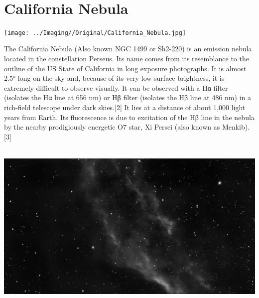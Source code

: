 \ \\\section{California Nebula}
\texttt{[image: ../Imaging//Original/California\_Nebula.jpg]}
{\footnotesize\color{white}
The California Nebula (Also known NGC 1499 or Sh2-220) is an emission nebula located in the constellation Perseus. Its name comes from its resemblance to the outline of the US State of California in long exposure photographs. It is almost 2.5° long on the sky and, because of its very low surface brightness, it is extremely difficult to observe visually. It can be observed with a Hα filter (isolates the Hα line at 656 nm) or Hβ filter (isolates the Hβ line at 486 nm) in a rich-field telescope under dark skies.[2] It lies at a distance of about 1,000 light years from Earth. Its fluorescence is due to excitation of the Hβ line in the nebula by the nearby prodigiously energetic O7 star, Xi Persei (also known as Menkib).[3]


}\ \\
\includegraphics[width=\textwidth]{../Imaging//Grayscale/California_Nebula.jpg}
